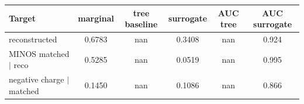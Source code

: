 \begin{tabular}{lccccc}
\toprule
Target & marginal & tree baseline & surrogate & AUC tree & AUC surrogate \\
\midrule
reconstructed & 0.6783 & nan & 0.3408 & nan & 0.924 \\
MINOS matched $\mid$ reco & 0.5285 & nan & 0.0519 & nan & 0.995 \\
negative charge $\mid$ matched & 0.1450 & nan & 0.1086 & nan & 0.866 \\
\bottomrule
\end{tabular}
